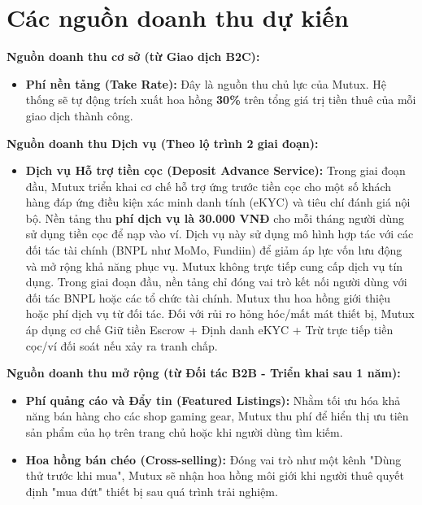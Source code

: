\section{Các nguồn doanh thu dự kiến}

\textbf{Nguồn doanh thu cơ sở (từ Giao dịch B2C):}
\begin{itemize}
    \item \textbf{Phí nền tảng (Take Rate):} Đây là nguồn thu chủ lực của Mutux. Hệ thống sẽ tự động trích xuất hoa hồng \textbf{30\%} trên tổng giá trị tiền thuê của mỗi giao dịch thành công.
\end{itemize}

\textbf{Nguồn doanh thu Dịch vụ (Theo lộ trình 2 giai đoạn):}
\begin{itemize}
    \item \textbf{Dịch vụ Hỗ trợ tiền cọc (Deposit Advance Service):} Trong giai đoạn đầu, Mutux triển khai cơ chế hỗ trợ ứng trước tiền cọc cho một số khách hàng đáp ứng điều kiện xác minh danh tính (eKYC) và tiêu chí đánh giá nội bộ. Nền tảng thu \textbf{phí dịch vụ là 30.000 VNĐ} cho mỗi tháng người dùng sử dụng tiền cọc để nạp vào ví. Dịch vụ này sử dụng mô hình hợp tác với các đối tác tài chính (BNPL như MoMo, Fundiin) để giảm áp lực vốn lưu động và mở rộng khả năng phục vụ. Mutux không trực tiếp cung cấp dịch vụ tín dụng. Trong giai đoạn đầu, nền tảng chỉ đóng vai trò kết nối người dùng với đối tác BNPL hoặc các tổ chức tài chính. Mutux thu hoa hồng giới thiệu hoặc phí dịch vụ từ đối tác. Đối với rủi ro hỏng hóc/mất mát thiết bị, Mutux áp dụng cơ chế Giữ tiền Escrow + Định danh eKYC + Trừ trực tiếp tiền cọc/ví đối soát nếu xảy ra tranh chấp.
\end{itemize}

\textbf{Nguồn doanh thu mở rộng (từ Đối tác B2B - Triển khai sau 1 năm):}
\begin{itemize}
    \item \textbf{Phí quảng cáo và Đẩy tin (Featured Listings):} Nhằm tối ưu hóa khả năng bán hàng cho các shop gaming gear, Mutux thu phí để hiển thị ưu tiên sản phẩm của họ trên trang chủ hoặc khi người dùng tìm kiếm. 
    \item \textbf{Hoa hồng bán chéo (Cross-selling):} Đóng vai trò như một kênh "Dùng thử trước khi mua", Mutux sẽ nhận hoa hồng môi giới khi người thuê quyết định "mua đứt" thiết bị sau quá trình trải nghiệm.
\end{itemize}
